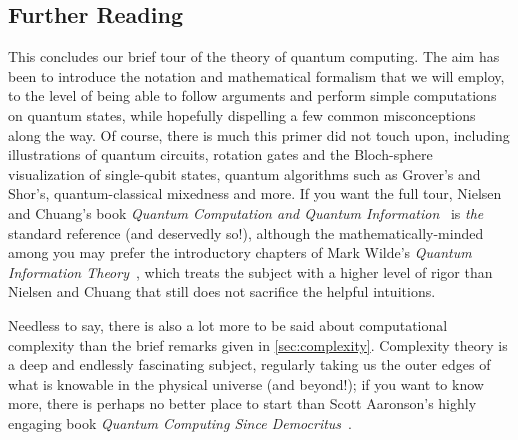   \subsection{Further Reading}
    This concludes our brief tour of the theory of quantum computing. The 
      aim has been to introduce the notation and mathematical formalism that
      we will employ, to the level of being able to 
      follow arguments and perform simple computations on quantum states, 
      while hopefully dispelling a few common misconceptions along the way. 
      Of course, there is much this primer did not
      touch upon, including illustrations of quantum circuits, 
      rotation gates and the Bloch-sphere visualization of single-qubit states, 
      quantum algorithms such as Grover's and Shor's,
      quantum-classical mixedness and more. If you want the full tour,
      Nielsen and Chuang's book \emph{Quantum Computation and
      Quantum Information}~\cite{NieChu10} is \emph{the} standard
      reference (and deservedly so!), although the mathematically-minded among you
      may prefer the introductory chapters of Mark Wilde's \emph{Quantum Information
      Theory}~\cite{Wilde17}, which treats the subject with a higher level of
      rigor than Nielsen and Chuang that still does not sacrifice the helpful
      intuitions.

    Needless to say, there is also a lot more to be said about computational complexity than
      the brief remarks given in \cref{sec:complexity}. Complexity theory is a deep
      and endlessly fascinating subject, regularly taking us the outer edges of what
      is knowable in the physical universe (and beyond!); if you want to know more, 
      there is perhaps no better place to start than Scott Aaronson's highly
      engaging book \emph{Quantum Computing Since Democritus}~\cite{Aaronson13}.
        
